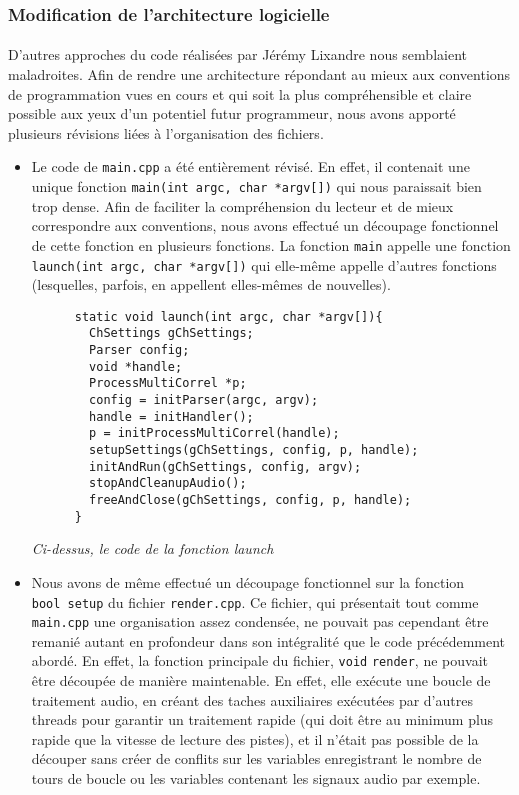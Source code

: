 \subsubsection{Modification de l'architecture logicielle}
\paragraph{}
D'autres approches du code réalisées par Jérémy Lixandre nous
semblaient maladroites. Afin de rendre une architecture répondant au
mieux aux conventions de programmation vues en cours et qui soit la
plus compréhensible et claire possible aux yeux d'un potentiel futur
programmeur, nous avons apporté plusieurs révisions liées à
l'organisation des fichiers.
\begin{itemize}
  \item Le code de \verb!main.cpp! a été entièrement révisé. En effet,
    il contenait une unique fonction
    \verb!main(int argc, char *argv[])! qui nous paraissait bien trop
    dense. Afin de faciliter la compréhension du lecteur et de mieux
    correspondre aux conventions, nous avons effectué un découpage
    fonctionnel de cette fonction en plusieurs fonctions. La fonction
    \verb!main! appelle une fonction
    \verb!launch(int argc, char *argv[])! qui elle-même appelle
    d'autres fonctions (lesquelles, parfois, en appellent elles-mêmes
    de nouvelles).

    \begin{lstlisting}
      static void launch(int argc, char *argv[]){
        ChSettings gChSettings;
        Parser config;
        void *handle;
        ProcessMultiCorrel *p;
        config = initParser(argc, argv);
        handle = initHandler();
        p = initProcessMultiCorrel(handle);
        setupSettings(gChSettings, config, p, handle);
        initAndRun(gChSettings, config, argv);
        stopAndCleanupAudio();
        freeAndClose(gChSettings, config, p, handle);
      }
    \end{lstlisting}

    \begin{center}
      \textit{Ci-dessus, le code de la fonction launch}
    \end{center}

    \item Nous avons de même effectué un découpage fonctionnel sur la
      fonction \\ \verb!bool setup!  du fichier \verb!render.cpp!. Ce
      fichier, qui présentait tout comme \verb!main.cpp! une
      organisation assez condensée, ne pouvait pas cependant être
      remanié autant en profondeur dans son intégralité que le code
      précédemment abordé. En effet, la fonction principale du
      fichier, \verb!void!  \verb!render!, ne pouvait être découpée de
      manière maintenable. En effet, elle exécute une boucle de
      traitement audio, en créant des taches auxiliaires exécutées par
      d'autres threads pour garantir un traitement rapide (qui doit
      être au minimum plus rapide que la vitesse de lecture des
      pistes), et il n'était pas possible de la découper sans créer de
      conflits sur les variables enregistrant le nombre de tours de
      boucle ou les variables contenant les signaux audio par exemple.


\end{itemize}
